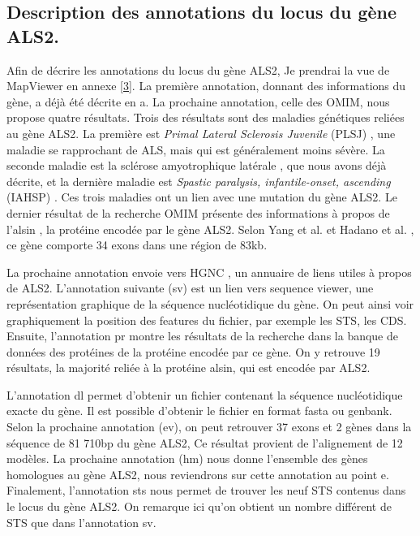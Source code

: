 \documentclass[10.9pt]{article} %
\begin{document}
\subsection[Annotations du gène ALS2]{Description des annotations du locus du gène ALS2.}

Afin de décrire les annotations du locus du gène ALS2, Je prendrai la vue de MapViewer en annexe \ref{3}. La première annotation, 
donnant des informations du gène, a déjà été décrite en a. La prochaine annotation, celle des OMIM, nous propose quatre résultats. 
Trois des résultats sont des maladies génétiques reliées au gène ALS2. La première est \emph{Primal Lateral Sclerosis Juvenile} (PLSJ) \cite{OMIM-PLS},
une maladie se rapprochant de ALS, mais qui est généralement moins sévère. La seconde maladie est la sclérose amyotrophique latérale \cite{OMIM-ALS}, 
que nous avons déjà décrite, et la dernière maladie est \emph{Spastic paralysis, infantile-onset, ascending} (IAHSP) \cite{OMIM-IAHSP}. 
Ces trois maladies ont un lien avec une mutation du gène ALS2. Le dernier résultat de la recherche OMIM présente des informations à
propos de l'alsin \cite{OMIM-alsin}, la protéine encodée par le gène ALS2. Selon Yang et al. \cite{Yang and al.} et Hadano et al. \cite{Hadano and al.}, ce gène comporte 34 exons 
dans une région de 83kb.

La prochaine annotation envoie vers HGNC \cite{Genetics Home Reference}, un annuaire de liens utiles à propos de ALS2. L'annotation suivante (sv) 
est un lien vers sequence viewer, une représentation graphique de la séquence nucléotidique du gène. On peut ainsi voir graphiquement la
position des features du fichier, par exemple les STS, les CDS. Ensuite, l'annotation pr montre les résultats de la recherche dans la
banque de données des protéines de la protéine encodée par ce gène. On y retrouve 19 résultats, la majorité reliée à la protéine alsin,
qui est encodée par ALS2. 

L'annotation dl permet d'obtenir un fichier contenant la séquence nucléotidique exacte du gène.
Il est possible d'obtenir le fichier en format fasta ou genbank. Selon la prochaine annotation (ev), on peut retrouver
37 exons et 2 gènes dans la séquence de 81 710bp du gène ALS2, Ce résultat provient de l'alignement de 12 modèles. 
La prochaine annotation (hm) nous donne l'ensemble des gènes homologues au gène ALS2, nous reviendrons sur cette annotation au point e. 
Finalement, l'annotation sts nous permet de trouver les neuf STS contenus dans le locus du gène ALS2. 
On remarque ici qu'on obtient un nombre différent de STS que dans l'annotation sv.
\end{document}
